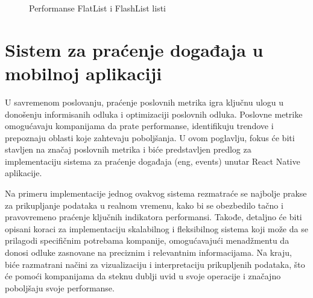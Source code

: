 \documentclass[12pt,oneside]{memoir}
\begin{document}
\begin{figure}[!h]
    \centering
    \qquad
    \caption{Performanse FlatList i FlashList listi}
    \label{fig:flashVSFlat}
\end{figure}

\chapter{Sistem za praćenje događaja u mobilnoj aplikaciji}

U savremenom poslovanju, praćenje poslovnih metrika igra ključnu ulogu u donošenju informisanih odluka i optimizaciji poslovnih odluka. Poslovne metrike omogućavaju kompanijama da prate performanse, identifikuju trendove i prepoznaju oblasti koje zahtevaju poboljšanja. U ovom poglavlju, fokus će biti stavljen na značaj poslovnih metrika i biće predstavljen predlog za implementaciju sistema za praćenje događaja (eng, events) unutar React Native aplikacije.

Na primeru implementacije jednog ovakvog sistema rezmatraće se najbolje prakse za prikupljanje podataka u realnom vremenu, kako bi se obezbedilo tačno i pravovremeno praćenje ključnih indikatora performansi. Takođe, detaljno će biti opisani koraci za implementaciju skalabilnog i fleksibilnog sistema koji može da se prilagodi specifičnim potrebama kompanije, omogućavajući menadžmentu da donosi odluke zasnovane na preciznim i relevantnim informacijama. Na kraju, biće razmatrani načini za vizualizaciju i interpretaciju prikupljenih podataka, što će pomoći kompanijama da steknu dublji uvid u svoje operacije i značajno poboljšaju svoje performanse.
\end{document}
